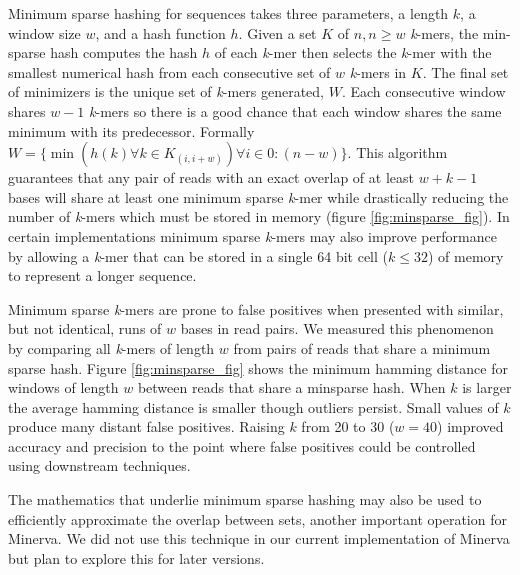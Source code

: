 Minimum sparse hashing for sequences takes three parameters, a length $k$, a window size $w$, and a hash function $h$. Given a set $K$ of $n, n \geq w$ \textit{k}-mers, the min-sparse hash computes the hash $h$ of each \textit{k}-mer then selects the \textit{k}-mer with the smallest numerical hash from each consecutive set of $w$ \textit{k}-mers in $K$. The final set of minimizers is the unique set of \textit{k}-mers generated, $W$. Each consecutive window shares $w-1$ \textit{k}-mers so there is a good chance that each window shares the same minimum with its predecessor. Formally $W = \{\min(h(k) \forall k \in K_{(i,i+w)}) \forall i \in 0:(n-w)\}$. This algorithm guarantees that any pair of reads with an exact overlap of at least $w + k - 1$ bases will share at least one minimum sparse \textit{k}-mer while drastically reducing the number of \textit{k}-mers which must be stored in memory (figure \ref{fig:minsparse_fig}). In certain implementations minimum sparse \textit{k}-mers may also improve performance by allowing a \textit{k}-mer that can be stored in a single 64 bit cell ($ k\leq 32$) of memory to represent a longer sequence.

Minimum sparse \textit{k}-mers are prone to false positives when presented with similar, but not identical, runs of $w$ bases in read pairs. We measured this phenomenon by comparing all \textit{k}-mers of length $w$ from pairs of reads that share a minimum sparse hash. Figure \ref{fig:minsparse_fig} shows the minimum hamming distance for windows of length $w$ between reads that share a minsparse hash. When $k$ is larger the average hamming distance is smaller though outliers persist. Small values of $k$ produce many distant false positives. Raising $k$ from 20 to 30 ($w=40$) improved accuracy and precision to the point where false positives could be controlled using downstream techniques.



The mathematics that underlie minimum sparse hashing may also be used to efficiently approximate the overlap between sets, another important operation for Minerva. We did not use this technique in our current implementation of Minerva but plan to explore this for later versions. %





